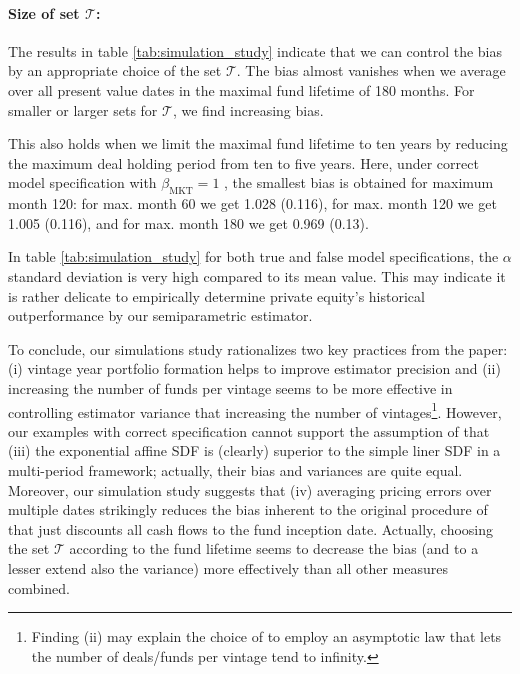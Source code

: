\documentclass[12pt]{article}
\begin{document}
\paragraph{Size of set $\mathcal{T}$:}
The results in table \ref{tab:simulation_study} indicate that we can control the bias by 
an appropriate choice of the set $\mathcal{T}$.
The bias almost vanishes when we average over all present value dates in the maximal fund lifetime of 180 months. 
For smaller or larger sets for $\mathcal{T}$, we find increasing bias.

This also holds when we limit the maximal fund lifetime to ten years by reducing the maximum deal holding period from ten to five years. 
Here, under correct model specification with $\beta_{\mathrm{MKT}}=1$ , the smallest bias is obtained for maximum month 120:
for max. month 60 we get 1.028 (0.116), for max. month 120 we get 1.005 (0.116), and for max. month 180 we get 0.969 (0.13).

In table \ref{tab:simulation_study} for both true and false model specifications, the $\alpha$ standard deviation is very high compared to its mean value.
This may indicate it is rather delicate to empirically determine private equity's historical outperformance by our semiparametric estimator. \newline

To conclude, our simulations study rationalizes two key practices from the \cite{DLP12} paper: (i) vintage year portfolio formation helps to improve estimator precision and (ii) increasing the number of funds per vintage seems to be more effective in controlling estimator variance that increasing the number of vintages\footnote{Finding (ii) may explain the choice of \cite{DLP12} to employ an asymptotic law that lets the number of deals/funds per vintage tend to infinity.}.
However, our examples with correct specification cannot support the assumption of \cite{KN16} that (iii) the exponential affine SDF is (clearly) superior to the simple liner SDF in a multi-period framework; actually, their bias and variances are quite equal.
Moreover, our simulation study suggests that (iv) averaging pricing errors over multiple dates strikingly reduces the bias inherent to the original procedure of \cite{DLP12} that just discounts all cash flows to the fund inception date.
Actually, choosing the set $\mathcal{T}$ according to the fund lifetime seems to decrease the bias (and to a lesser extend also the variance) more effectively than all other measures combined.
\end{document}
